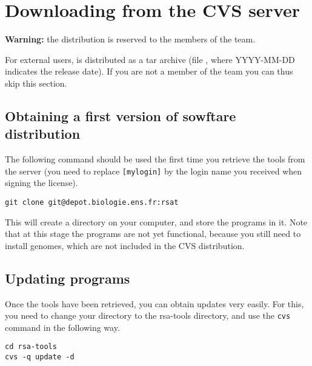 \section{Downloading \RSAT from the CVS server}

\textbf{Warning:} the  distribution is reserved to the
members of the \RSAT team. 

For external users, \RSAT is distributed as a tar archive (file
, where YYYY-MM-DD indicates the
release date). If you are not a member of the \RSAT team you can thus
skip this section.

\subsection{Obtaining a first version of \RSAT sowftare distribution}

The following command should be used the first time you retrieve the
tools from the server (you need to replace \texttt{[mylogin]} by the
login name you received when signing the \RSAT license).

\begin{lstlisting}
git clone git@depot.biologie.ens.fr:rsat
\end{lstlisting}


This will create a directory  on your computer, and
store the programs in it. Note that at this stage the programs are not
yet functional, because you still need to install genomes, which are
not included in the CVS distribution.

\subsection{Updating \RSAT programs}

Once the tools have been retrieved, you can obtain updates very
easily. For this, you need to change your directory to the rsa-tools
directory, and use the \texttt{cvs} command in the following way.

\begin{lstlisting}
cd rsa-tools
cvs -q update -d
\end{lstlisting}


